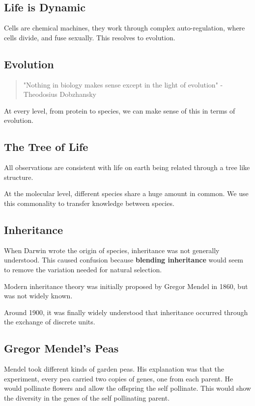 \subsection{Life is Dynamic}
Cells are chemical machines, they work through complex auto-regulation, where cells divide, and fuse sexually. This resolves to evolution.

\subsection{Evolution}

\begin{quote}
    "Nothing in biology makes sense except in the light of evolution" - Theodosius Dobzhansky
\end{quote}
At every level, from protein to species, we can make sense of this in terms of evolution.

\subsection{The Tree of Life}
All observations are consistent with life on earth being related through a tree like structure.

\par\noindent At the molecular level, different species share a huge amount in common. We use this commonality to transfer knowledge between species.

\subsection{Inheritance}
When Darwin wrote the origin of species, inheritance was not generally understood. This caused confusion because \textbf{blending inheritance} would seem to remove the variation needed for natural selection.

\par\noindent Modern inheritance theory was initially proposed by Gregor Mendel in 1860, but was not widely known.

\par\noindent Around 1900, it was finally widely understood that inheritance occurred through the exchange of discrete units.

\subsection{Gregor Mendel's Peas}
Mendel took different kinds of garden peas. His explanation was that the experiment, every pea carried two copies of genes, one from each parent. He would pollinate flowers and allow the offspring the self pollinate. This would show the diversity in the genes of the self pollinating parent.